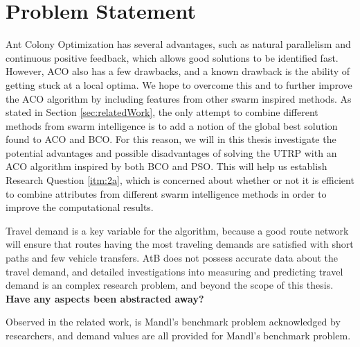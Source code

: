 \section{Problem Statement}

Ant Colony Optimization has several advantages, such as natural parallelism and continuous positive feedback, which allows good solutions to be identified fast. However, ACO also has a few drawbacks, and a known drawback is the ability of getting stuck at a local optima. We hope to overcome this and to further improve the ACO algorithm by including features from other swarm inspired methods. As stated in Section \vref{sec:relatedWork}, the only attempt to combine different methods from swarm intelligence is to add a notion of the global best solution found to ACO and BCO. For this reason, we will in this thesis investigate the potential advantages and possible disadvantages of solving the UTRP with an ACO algorithm inspired by both BCO and PSO. This will help us establish Research Question \vref{itm:2a}, which is concerned about whether or not it is efficient to combine attributes from different swarm intelligence methods in order to improve the computational results. %

Travel demand is a key variable for the algorithm, because a good route network will ensure that routes having the most traveling demands are satisfied with short paths and few vehicle transfers. AtB\citep{website:atb} does not possess accurate data about the travel demand, and detailed investigations into measuring and predicting travel demand is an complex research problem, and beyond the scope of this thesis. \textbf{Have any aspects been abstracted away?}\citep{cohen88}

Observed in the related work, is Mandl's benchmark problem acknowledged by researchers, and demand values are all provided for Mandl's benchmark problem. %

